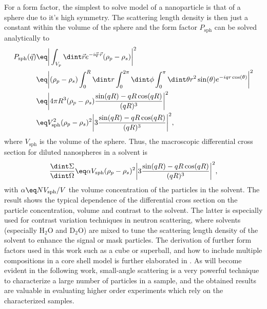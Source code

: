 \documentclass[\main/dresen_thesis.tex]{subfiles}
\begin{document}
For a form factor, the simplest to solve model of a nanoparticle is that of a sphere due to it's high symmetry.
The scattering length density is then just a constant within the volume of the sphere and the form factor $P_\mathrm{sph}$ can be solved analytically to
\begin{align}
  P_\mathrm{sph} (\vec{q})
  \eq & \bigg|\int_{V_{p}} \dint \vec{r} e^{-i\vec{q} \cdot \vec{r}} (\rho_p - \rho_s) \bigg|^2 \\
  \eq & \bigg|(\rho_p - \rho_s) \int_0^R \dint r \int_0^{2 \pi} \dint \phi \int_0^\pi \dint \theta r^2 \sin(\theta) e^{-i q r \cos(\theta)}  \bigg|^2 \\
  \eq &  \bigg| 4\pi R^3 (\rho_p - \rho_s) \frac{\sin(qR) - qR\cos(qR)}{(qR)^3}  \bigg|^2\\
  \eq & V_\mathrm{sph}^2 (\rho_p - \rho_s)^2 \bigg|3 \frac{\sin(qR) - qR\cos(qR)}{(qR)^3}  \bigg|^2,
\end{align}
where $V_\mathrm{sph}$ is the volume of the sphere.
Thus, the macroscopic differential cross section for diluted nanospheres in a solvent is
\begin{align}
  \frac{\dint \Sigma}{\dint \Omega}
  \eq \alpha V_\mathrm{sph} (\rho_p - \rho_s)^2 \bigg|3 \frac{\sin(qR) - qR\cos(qR)}{(qR)^3}  \bigg|^2,
\end{align}
with $\alpha \eq NV_\mathrm{sph} / V$ the volume concentration of the particles in the solvent.
The result shows the typical dependence of the differential cross section on the particle concentration, volume and contrast to the solvent.
The latter is especially used for contrast variation techniques in neutron scattering, where solvents (especially $\mathrm{H_2O}$ and $\mathrm{D_2O}$) are mixed to tune the scattering length density of the solvent to enhance the signal or mask particles.
The derivation of further form factors used in this work such as a cube or superball, and how to include multiple compositions in a core shell model is further elaborated in .
As will become evident in the following work, small-angle scattering is a very powerful technique to characterize a large number of particles in a sample, and the obtained results are valuable in evaluating higher order experiments which rely on the characterized samples.
\end{document}
